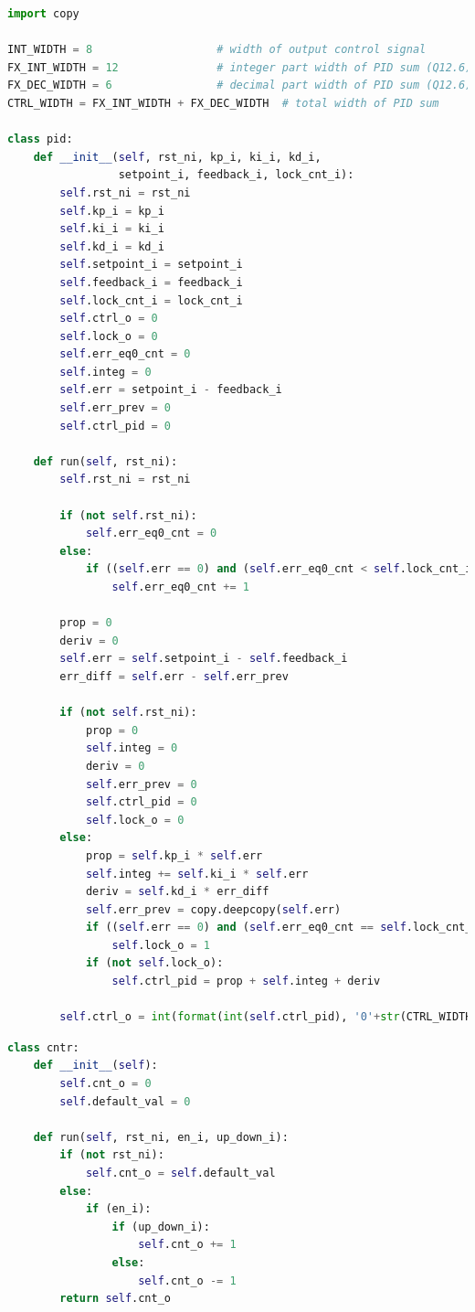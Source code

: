 \documentclass[master]{finthesis}
\def \PID  {ПИД} %
\begin{document}
\begin{lstlisting}[language=Python, caption={Имплементација класе \PID\ регулатора.}, label={lst:py:pid}]
import copy

INT_WIDTH = 8                   # width of output control signal
FX_INT_WIDTH = 12               # integer part width of PID sum (Q12.6)
FX_DEC_WIDTH = 6                # decimal part width of PID sum (Q12.6)
CTRL_WIDTH = FX_INT_WIDTH + FX_DEC_WIDTH  # total width of PID sum

class pid:
    def __init__(self, rst_ni, kp_i, ki_i, kd_i,
                 setpoint_i, feedback_i, lock_cnt_i):
        self.rst_ni = rst_ni
        self.kp_i = kp_i
        self.ki_i = ki_i
        self.kd_i = kd_i
        self.setpoint_i = setpoint_i
        self.feedback_i = feedback_i
        self.lock_cnt_i = lock_cnt_i
        self.ctrl_o = 0
        self.lock_o = 0
        self.err_eq0_cnt = 0
        self.integ = 0
        self.err = setpoint_i - feedback_i
        self.err_prev = 0
        self.ctrl_pid = 0

    def run(self, rst_ni):
        self.rst_ni = rst_ni

        if (not self.rst_ni):
            self.err_eq0_cnt = 0
        else:
            if ((self.err == 0) and (self.err_eq0_cnt < self.lock_cnt_i)):
                self.err_eq0_cnt += 1

        prop = 0
        deriv = 0
        self.err = self.setpoint_i - self.feedback_i
        err_diff = self.err - self.err_prev

        if (not self.rst_ni):
            prop = 0
            self.integ = 0
            deriv = 0
            self.err_prev = 0
            self.ctrl_pid = 0
            self.lock_o = 0
        else:
            prop = self.kp_i * self.err
            self.integ += self.ki_i * self.err
            deriv = self.kd_i * err_diff
            self.err_prev = copy.deepcopy(self.err)
            if ((self.err == 0) and (self.err_eq0_cnt == self.lock_cnt_i) and (self.lock_cnt_i != 0)):
                self.lock_o = 1
            if (not self.lock_o):
                self.ctrl_pid = prop + self.integ + deriv

        self.ctrl_o = int(format(int(self.ctrl_pid), '0'+str(CTRL_WIDTH)+'b')[FX_INT_WIDTH-INT_WIDTH:FX_INT_WIDTH], 2)
\end{lstlisting}
\begin{lstlisting}[language=Python, caption={Имплементација класе бројача двостепеног регулатора.}, label={lst:py:cnt}]
class cntr:
    def __init__(self):
        self.cnt_o = 0
        self.default_val = 0

    def run(self, rst_ni, en_i, up_down_i):
        if (not rst_ni):
            self.cnt_o = self.default_val
        else:    
            if (en_i):
                if (up_down_i):
                    self.cnt_o += 1
                else:
                    self.cnt_o -= 1
        return self.cnt_o
\end{lstlisting}
\end{document}
